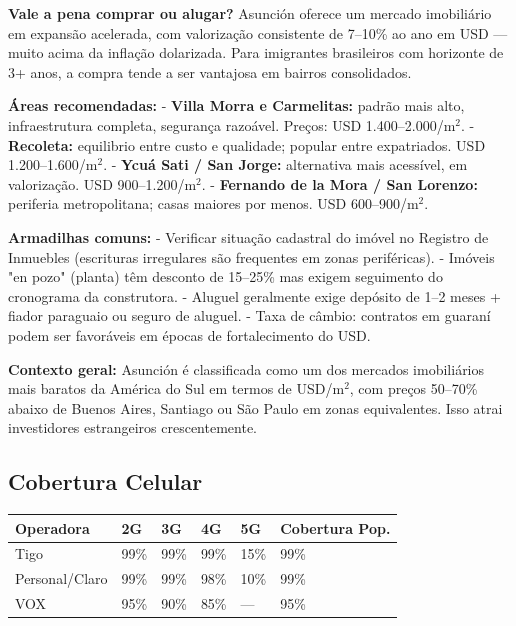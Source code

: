 \textbf{Vale a pena comprar ou alugar?}
Asunción oferece um mercado imobiliário em expansão acelerada, com valorização consistente de 7--10\% ao ano em USD --- muito acima da inflação dolarizada. Para imigrantes brasileiros com horizonte de 3+ anos, a compra tende a ser vantajosa em bairros consolidados.

\textbf{Áreas recomendadas:}
- \textbf{Villa Morra e Carmelitas:} padrão mais alto, infraestrutura completa, segurança razoável. Preços: USD 1.400--2.000/m$^2$.
- \textbf{Recoleta:} equilibrio entre custo e qualidade; popular entre expatriados. USD 1.200--1.600/m$^2$.
- \textbf{Ycuá Sati / San Jorge:} alternativa mais acessível, em valorização. USD 900--1.200/m$^2$.
- \textbf{Fernando de la Mora / San Lorenzo:} periferia metropolitana; casas maiores por menos. USD 600--900/m$^2$.

\textbf{Armadilhas comuns:}
- Verificar situação cadastral do imóvel no Registro de Inmuebles (escrituras irregulares são frequentes em zonas periféricas).
- Imóveis "en pozo" (planta) têm desconto de 15--25\% mas exigem seguimento do cronograma da construtora.
- Aluguel geralmente exige depósito de 1--2 meses + fiador paraguaio ou seguro de aluguel.
- Taxa de câmbio: contratos em guaraní podem ser favoráveis em épocas de fortalecimento do USD.

\textbf{Contexto geral:}
Asunción é classificada como um dos mercados imobiliários mais baratos da América do Sul em termos de USD/m$^2$, com preços 50--70\% abaixo de Buenos Aires, Santiago ou São Paulo em zonas equivalentes. Isso atrai investidores estrangeiros crescentemente.




\subsection{Cobertura Celular}



{\small
\setlength{\tabcolsep}{3pt}
\renewcommand{\arraystretch}{1.12}
{\small
\begin{tabularx}{\linewidth}{lXXXXX}
\toprule
Operadora & 2G & 3G & 4G & 5G & Cobertura Pop. \\
\midrule
Tigo & 99\% & 99\% & 99\% & 15\% & 99\% \\
Personal/Claro & 99\% & 99\% & 98\% & 10\% & 99\% \\
VOX & 95\% & 90\% & 85\% & --- & 95\% \\
\bottomrule
\end{tabularx}
}
}

